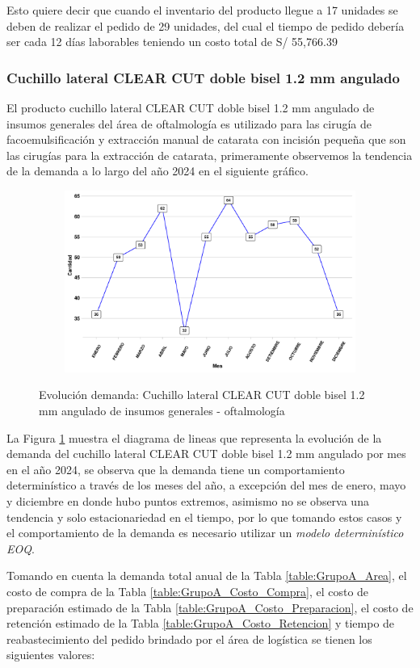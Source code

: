 Esto quiere decir que cuando el inventario del producto llegue a 17 unidades se deben de realizar el pedido de 29 unidades, del cual el tiempo de pedido debería ser cada 12 días laborables teniendo un costo total de S/ 55,766.39
\clearpage
\subsubsection{Cuchillo lateral CLEAR CUT doble bisel 1.2 mm angulado}

El producto cuchillo lateral CLEAR CUT doble bisel 1.2 mm angulado de insumos generales del área de oftalmología es utilizado para las cirugía de facoemulsificación y extracción manual de catarata con incisión pequeña que son las cirugías para la extracción de catarata, primeramente observemos la tendencia de la demanda a lo largo del año 2024 en el siguiente gráfico.

\begin{figure}[H]
  \caption{Evolución demanda: Cuchillo lateral CLEAR CUT doble bisel 1.2 mm angulado de insumos generales - oftalmología}
  {\includegraphics[width=15cm, height=5.95cm]{images/PROD006_demanda.pdf}}
  \label{fig:PROD006_demanda}
\end{figure}

La Figura \ref{fig:PROD006_demanda} muestra el diagrama de lineas que representa la evolución de la demanda del cuchillo lateral CLEAR CUT doble bisel 1.2 mm angulado por mes en el año 2024, se observa que la demanda tiene un comportamiento determinístico a través de los meses del año, a excepción del mes de enero, mayo y diciembre en donde hubo puntos extremos, asimismo no se observa una tendencia y solo estacionariedad en el tiempo, por lo que tomando estos casos y el comportamiento de la demanda es necesario utilizar un \textsl{modelo determinístico EOQ}.

Tomando en cuenta la demanda total anual de la Tabla \ref{table:GrupoA_Area}, el costo de compra de la Tabla \ref{table:GrupoA_Costo_Compra}, el costo de preparación estimado de la Tabla \ref{table:GrupoA_Costo_Preparacion}, el costo de retención estimado de la Tabla \ref{table:GrupoA_Costo_Retencion} y tiempo de reabastecimiento del pedido brindado por el área de logística se tienen los siguientes valores:

